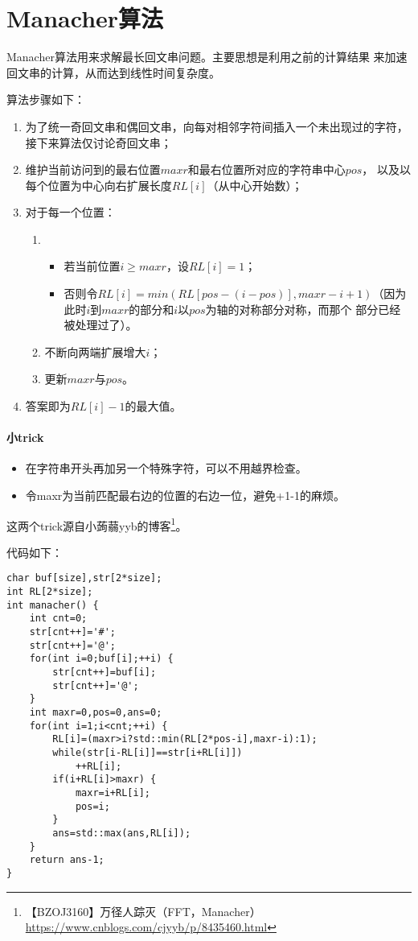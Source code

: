 \section{Manacher算法}
Manacher算法用来求解最长回文串问题。主要思想是利用之前的计算结果
来加速回文串的计算，从而达到线性时间复杂度。

算法步骤如下：
\begin{enumerate}
    \item 为了统一奇回文串和偶回文串，向每对相邻字符间插入一个未出现过的字符，
    接下来算法仅讨论奇回文串；
    \item 维护当前访问到的最右位置$maxr$和最右位置所对应的字符串中心$pos$，
    以及以每个位置为中心向右扩展长度$RL[i]$（从中心开始数）；
    \item 对于每一个位置：
    \begin{enumerate}
        \item
        \begin{itemize}
            \item 若当前位置$i\geq maxr$，设$RL[i]=1$；
            \item 否则令$RL[i]=min(RL[pos-(i-pos)],maxr-i+1)$（因为
            此时$i$到$maxr$的部分和$i$以$pos$为轴的对称部分对称，而那个
            部分已经被处理过了）。
        \end{itemize}
        \item 不断向两端扩展增大$i$；
        \item 更新$maxr$与$pos$。
    \end{enumerate}
    \item 答案即为$RL[i]-1$的最大值。
\end{enumerate}

\paragraph{小trick}
\begin{itemize}
    \item 在字符串开头再加另一个特殊字符，可以不用越界检查。
    \item 令maxr为当前匹配最右边的位置的右边一位，避免+1-1的麻烦。
\end{itemize}

这两个trick源自小蒟蒻yyb的博客\footnote{
    【BZOJ3160】万径人踪灭（FFT，Manacher）
    \url{https://www.cnblogs.com/cjyyb/p/8435460.html}
}。

代码如下：
\begin{lstlisting}
char buf[size],str[2*size];
int RL[2*size];
int manacher() {
    int cnt=0;
    str[cnt++]='#';
    str[cnt++]='@';
    for(int i=0;buf[i];++i) {
        str[cnt++]=buf[i];
        str[cnt++]='@';
    }
    int maxr=0,pos=0,ans=0;
    for(int i=1;i<cnt;++i) {
        RL[i]=(maxr>i?std::min(RL[2*pos-i],maxr-i):1);
        while(str[i-RL[i]]==str[i+RL[i]])
            ++RL[i];
        if(i+RL[i]>maxr) {
            maxr=i+RL[i];
            pos=i;
        }
        ans=std::max(ans,RL[i]);
    }
    return ans-1;
}
\end{lstlisting}

